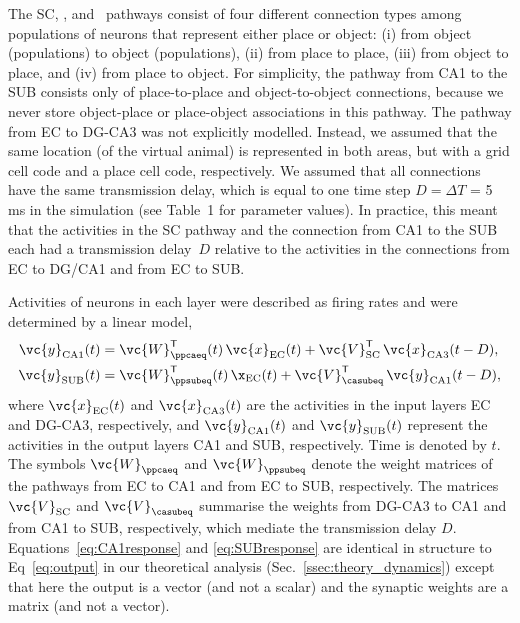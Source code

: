 The SC, \ppca, and \ppsub~pathways consist of four different connection types among populations of neurons that represent either place or object: (i) from object (populations) to object (populations), (ii) from place to place, (iii) from object to place, and (iv) from place to object. For simplicity, the pathway from CA1 to the SUB consists only of place-to-place and object-to-object connections, because we never store object-place or place-object associations in this pathway. The pathway from EC to DG-CA3 was not explicitly modelled. Instead, we assumed that the same location (of the virtual animal) is represented in both areas, but with a grid cell code and a place cell code, respectively. We assumed that all connections have the same transmission delay, which is equal to one time step $D = \Delta T$ = 5 ms in the simulation (see Table~1 for parameter values). In practice, this meant that the activities in the SC pathway and the connection from CA1 to the SUB each had a transmission delay~$D$ relative to the activities in the connections from EC to DG/CA1 and from EC to SUB.

Activities of neurons in each layer were described as firing rates and were determined by a linear model,
\begin{align}
\vc{y}_{\rm CA1}(t) &= \vc{W}^\mathsf{T}_{\ppcaeq} (t)\, \vc{x}_{\rm EC}(t) + \vc{V}^\mathsf{T}_{\rm SC} \, \vc{x}_{\rm CA3}(t-D), \label{eq:CA1response} \\
\vc{y}_{\rm SUB}(t) &= \vc{W}^\mathsf{T}_{\ppsubeq} (t)\, \x_{\rm EC}(t) + \vc{V}^\mathsf{T}_{\casubeq} \, \vc{y}_{\rm CA1}(t-D), \label{eq:SUBresponse}
\end{align}
where $\vc{x}_{\rm EC}(t)$ and $\vc{x}_{\rm CA3}(t)$ are the activities in the input layers EC and DG-CA3, respectively, and $\vc{y}_{\rm CA1}(t)$ and $\vc{y}_{\rm SUB}(t)$ represent the activities in the output layers  CA1 and SUB, respectively. Time is denoted by $t$. The symbols $\vc{W}_{\ppcaeq}$ and $\vc{W}_{\ppsubeq}$ denote the weight matrices of the pathways from EC to CA1 and from EC to SUB, respectively. The matrices $\vc{V}_{\rm SC}$ and $\vc{V}_{\casubeq}$ summarise the weights from DG-CA3 to CA1 and from CA1 to SUB, respectively, which mediate the transmission delay $D$.
Equations~\eqref{eq:CA1response} and \eqref{eq:SUBresponse} are identical in structure to Eq~\eqref{eq:output} in our theoretical analysis (Sec.~\ref{ssec:theory_dynamics}) except that here the output is a vector (and not a scalar) and the synaptic weights are a matrix (and not a vector).

